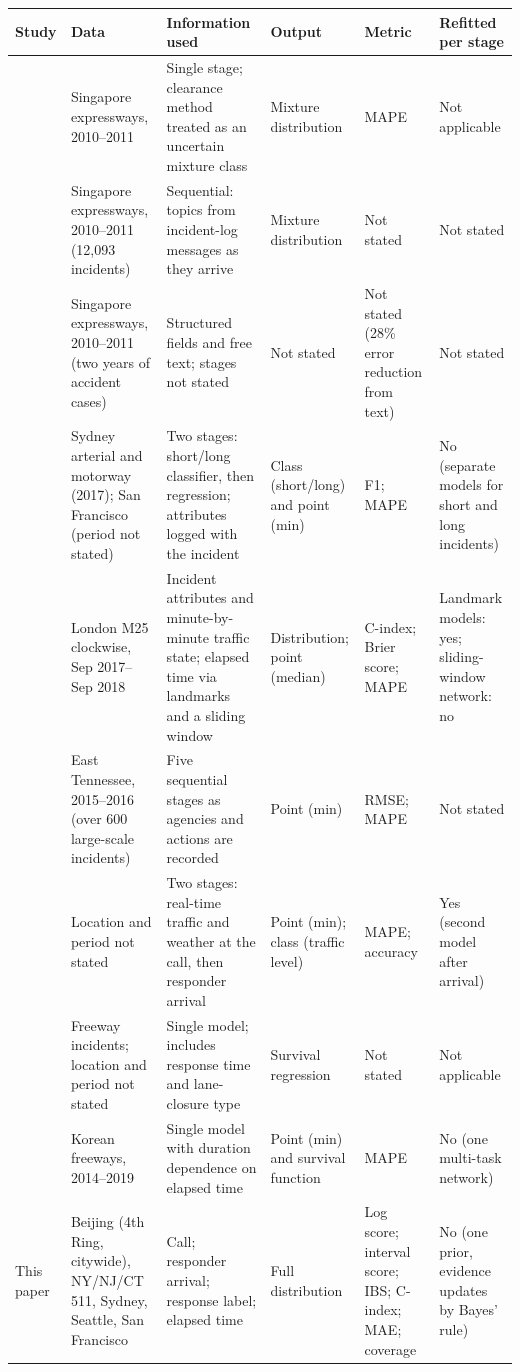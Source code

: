 \begin{tabular}{p{2.5cm}p{3.6cm}p{3.5cm}p{2.5cm}p{2.3cm}p{2.3cm}}
\toprule
Study & Data & Information used & Output & Metric & Refitted per stage \\
\midrule
\citet{Li2015AAP} & Singapore expressways, 2010--2011 & Single stage; clearance method treated as an uncertain mixture class & Mixture distribution & MAPE & Not applicable \\
\citet{Li2015TRC} & Singapore expressways, 2010--2011 (12,093 incidents) & Sequential: topics from incident-log messages as they arrive & Mixture distribution & Not stated & Not stated \\
\citet{Pereira_2013} & Singapore expressways, 2010--2011 (two years of accident cases) & Structured fields and free text; stages not stated & Not stated & Not stated (28\% error reduction from text) & Not stated \\
\citet{Grigorev2022TRC} & Sydney arterial and motorway (2017); San Francisco (period not stated) & Two stages: short/long classifier, then regression; attributes logged with the incident & Class (short/long) and point (min) & F1; MAPE & No (separate models for short and long incidents) \\
\citet{Kalair_2021} & London M25 clockwise, Sep 2017--Sep 2018 & Incident attributes and minute-by-minute traffic state; elapsed time via landmarks and a sliding window & Distribution; point (median) & C-index; Brier score; MAPE & Landmark models: yes; sliding-window network: no \\
\citet{Li_2020} & East Tennessee, 2015--2016 (over 600 large-scale incidents) & Five sequential stages as agencies and actions are recorded & Point (min) & RMSE; MAPE & Not stated \\
\citet{Abdi2023_new} & Location and period not stated & Two stages: real-time traffic and weather at the call, then responder arrival & Point (min); class (traffic level) & MAPE; accuracy & Yes (second model after arrival) \\
\citet{Zou2023DeepSurv} & Freeway incidents; location and period not stated & Single model; includes response time and lane-closure type & Survival regression & Not stated & Not applicable \\
\citet{Kim2024MTDNN} & Korean freeways, 2014--2019 & Single model with duration dependence on elapsed time & Point (min) and survival function & MAPE & No (one multi-task network) \\
\midrule
This paper & Beijing (4th Ring, citywide), NY/NJ/CT 511, Sydney, Seattle, San Francisco & Call; responder arrival; response label; elapsed time & Full distribution & Log score; interval score; IBS; C-index; MAE; coverage & No (one prior, evidence updates by Bayes' rule) \\
\bottomrule
\end{tabular}
